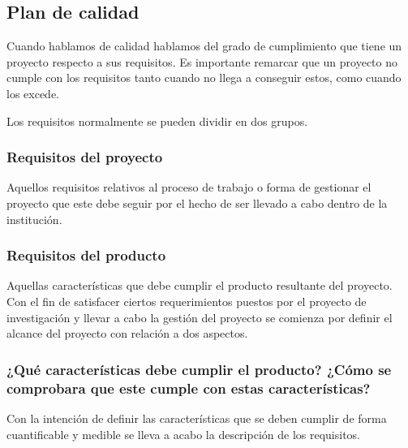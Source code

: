 \subsection{Plan de calidad}

Cuando hablamos de calidad hablamos del grado de cumplimiento que tiene un proyecto respecto a sus requisitos. Es importante remarcar que un proyecto no cumple con los requisitos tanto cuando no llega a conseguir estos, como cuando los excede.

Los requisitos normalmente se pueden dividir en dos grupos.

\subsubsection{Requisitos del proyecto}

Aquellos requisitos relativos al proceso de trabajo o forma de gestionar el proyecto que este debe seguir por el hecho de ser llevado a cabo dentro de la institución.

\subsubsection{Requisitos del producto}

Aquellas características que debe cumplir el producto resultante del proyecto. Con el fin de satisfacer ciertos requerimientos puestos por el proyecto de investigación y llevar a cabo la gestión del proyecto se comienza por definir el alcance del proyecto con relación a dos aspectos.

\subsubsection{¿Qué características debe cumplir el producto? ¿Cómo se comprobara que este cumple con estas características?}

Con la intención de definir las características que se deben cumplir de forma cuantificable y medible se lleva a acabo la descripción de los requisitos.\par

